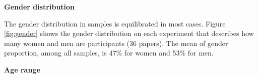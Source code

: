 	\begin{figure}[h] 

   	    \captionsetup{width=12cm}%
	\end{figure}

\textbf{Gender distribution}

The gender distribution in samples is equilibrated in most cases. Figure \ref{fig:gender} shows the gender distribution on each experiment that describes how many women and men are participants (36 papers). The mean of gender proportion, among all samples, is 47\% for women and 53\% for men.

	\begin{figure}[h] 

   	    \captionsetup{width=16cm}%
	\end{figure}

\textbf{Age range}

